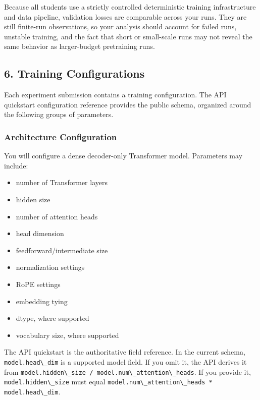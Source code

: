 \documentclass[
  11pt,
]{article}
\newcommand{\passthrough}[1]{#1}
\providecommand{\tightlist}{%
  \setlength{\itemsep}{0pt}\setlength{\parskip}{0pt}}
\begin{document}
Because all students use a strictly controlled deterministic training
infrastructure and data pipeline, validation losses are comparable
across your runs. They are still finite-run observations, so your
analysis should account for failed runs, unstable training, and the fact
that short or small-scale runs may not reveal the same behavior as
larger-budget pretraining runs.

\hypertarget{training-configurations}{%
\subsection{6. Training Configurations}\label{training-configurations}}

Each experiment submission contains a training configuration. The API
quickstart configuration reference provides the public schema, organized
around the following groups of parameters.

\hypertarget{architecture-configuration}{%
\subsubsection{Architecture
Configuration}\label{architecture-configuration}}

You will configure a dense decoder-only Transformer model. Parameters
may include:

\begin{itemize}
\tightlist
\item
  number of Transformer layers
\item
  hidden size
\item
  number of attention heads
\item
  head dimension
\item
  feedforward/intermediate size
\item
  normalization settings
\item
  RoPE settings
\item
  embedding tying
\item
  dtype, where supported
\item
  vocabulary size, where supported
\end{itemize}

The API quickstart is the authoritative field reference. In the current
schema, \passthrough{\lstinline!model.head\_dim!} is a supported model
field. If you omit it, the API derives it from
\passthrough{\lstinline!model.hidden\_size / model.num\_attention\_heads!}.
If you provide it, \passthrough{\lstinline!model.hidden\_size!} must
equal
\passthrough{\lstinline!model.num\_attention\_heads * model.head\_dim!}.
\end{document}
